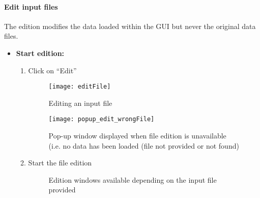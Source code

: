\documentclass[fadttsterUserGuide_use]{subfiles}
\begin{document}
	\paragraph{Edit input files}
	The edition modifies the data loaded within the GUI but never the original data files.
	\begin{itemize}
		\item \textbf{Start edition:}
		\begin{enumerate}
			\item Click on ``Edit''
			\begin{figure}[H]
  				\texttt{[image: editFile]}
  				\caption{Editing an input file}
    			\label{fig:edit_pushButton}
			\end{figure}
			\begin{figure}[H]
  				\texttt{[image: popup\_edit\_wrongFile]}
  				\caption{Pop-up window displayed when file edition is unavailable (i.e. no data has been loaded (file not provided or not found)}
    			\label{fig:warningPopUp_edition}
    		\end{figure}
			\item Start the file edition
			\begin{figure}[H]
				\caption{Edition windows available depending on the input file provided}
    			\label{fig:editionWindow_covariatesFile}
			\end{figure}
		\end{enumerate}
	\end{itemize}
	\vfill
	\newpage
	
\end{document}
